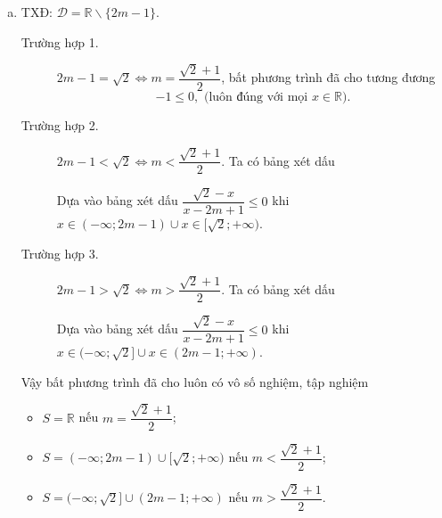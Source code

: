 \begin{bt}
{\begin{enumerate}[a)]
\begin{itemize}
				\item  $S=(-\infty;2)\cup (m;\infty)$ nếu $m>2$.
			\end{itemize}
			\item TXĐ: $\mathscr{D}=\mathbb{R}\backslash\{2m-1\} $.
			\begin{description}
				\item[Trường hợp 1.] $2m-1=\sqrt{2}\Leftrightarrow m=\dfrac{\sqrt{2}+1}{2}$, bất phương trình đã cho tương đương $$-1\leq 0, \text{ (luôn đúng với mọi $x\in\mathbb{R}$)}.$$
				\item[Trường hợp 2.] $2m-1<\sqrt{2}\Leftrightarrow m<\dfrac{\sqrt{2}+1}{2}$. Ta có bảng xét dấu
				\begin{center}
				\end{center}
				Dựa vào bảng xét dấu $\dfrac{\sqrt{2}-x}{x-2m+1}\leq 0$ khi $x \in (-\infty;2m-1)\cup x\in [\sqrt{2};+\infty)$.
				\item[Trường hợp 3.] $2m-1>\sqrt{2}\Leftrightarrow m>\dfrac{\sqrt{2}+1}{2}$. Ta có bảng xét dấu
				\begin{center}
				\end{center}
				Dựa vào bảng xét dấu $\dfrac{\sqrt{2}-x}{x-2m+1}\leq 0$ khi $x \in (-\infty;\sqrt{2}]\cup x\in (2m-1;+\infty)$.
			\end{description}
			Vậy bất phương trình đã cho luôn có vô số nghiệm, tập nghiệm
			\begin{itemize}
				\item $S=\mathbb{R}$ nếu $m=\dfrac{\sqrt{2}+1}{2}$;
				\item $S=(-\infty;2m-1)\cup[\sqrt{2};+\infty)$ nếu $m<\dfrac{\sqrt{2}+1}{2}$;
				\item $S=(-\infty;\sqrt{2}]\cup(2m-1;+\infty)$ nếu $m>\dfrac{\sqrt{2}+1}{2}$.
			\end{itemize}
		\end{enumerate}
	}
\end{bt}
